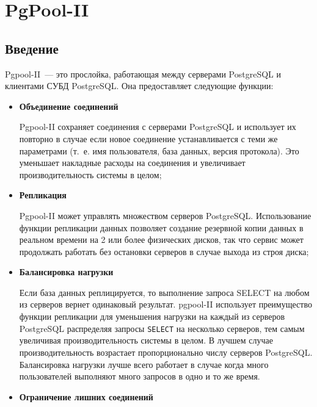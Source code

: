 \chapter{PgPool-II}

\begin{epigraphs}
\end{epigraphs}

\section{Введение}

Pgpool-II~--- это прослойка, работающая между серверами PostgreSQL и клиентами СУБД PostgreSQL. Она предоставляет следующие функции:

\begin{itemize}

\item \textbf{Объединение соединений}

Pgpool-II сохраняет соединения с серверами PostgreSQL и использует их повторно в случае если новое соединение устанавливается с теми же параметрами (т.~е. имя пользователя, база данных, версия протокола). Это уменьшает накладные расходы на соединения и увеличивает производительность системы в целом;

\item \textbf{Репликация}

Pgpool-II может управлять множеством серверов PostgreSQL. Использование функции репликации данных позволяет создание резервной копии данных в реальном времени на  2 или более физических дисков, так что сервис может продолжать работать без остановки серверов в случае выхода из строя диска;

\item \textbf{Балансировка нагрузки}

Если база данных реплицируется, то выполнение запроса SELECT на любом из серверов вернет одинаковый результат. pgpool-II использует преимущество функции репликации для уменьшения нагрузки на каждый из серверов PostgreSQL распределяя запросы \lstinline!SELECT! на несколько серверов, тем самым увеличивая производительность системы в целом. В лучшем случае производительность возрастает пропорционально числу серверов PostgreSQL. Балансировка нагрузки лучше всего работает в случае когда много пользователей выполняют много запросов в одно и то же время.

\item \textbf{Ограничение лишних соединений}


\end{itemize}
